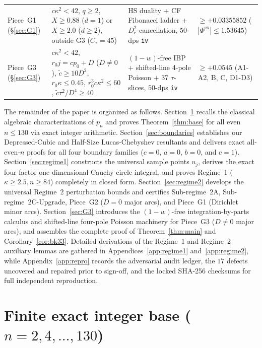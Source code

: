 \documentclass[10pt]{article}
\numberwithin{equation}{section}
\theoremstyle{plain}
\theoremstyle{definition}
\newcommand{\1}{\mathbf{1}}
\newcommand{\code}[1]{\texttt{#1}}
\begin{document}
\begin{table}[htbp]
\begin{tabularx}{\textwidth}{@{} >{\raggedright\arraybackslash}p{2.35cm} >{\raggedright\arraybackslash}X >{\raggedright\arraybackslash}p{3.45cm} >{\raggedright\arraybackslash}p{2.65cm} @{}}
\addlinespace[2pt]
Piece~G1 (\S\ref{sec:G1}) & $c\kappa^2 < 42$, $q \ge 2$, $X \ge 0.88$ ($d=1$) or $X \ge 2.0$ ($d \ge 2$), outside G3 ($C_\tau = 45$) & HS duality + CF Fibonacci ladder + $D_r^2$-cancellation, $50$-dps \code{iv} & $\ge +0.03355852$ ($|\Phi^{\mathrm{ex}}| \le 1.53645$) \\
\addlinespace[2pt]
Piece~G3 (\S\ref{sec:G3}) & $c\kappa^2 < 42$, $r_0 j = c p_0 + D$ ($D \ne 0$), $\tilde{c} \ge 10 D^2$, $r_0\kappa \le 0.45$, $r_0^3 c\kappa^2 \le 60$, $\tilde{c}\tau^2/D^4 \ge 40$ & $(1-w)$-free IBP + shifted-line 4-pole Poisson + 37 $\tau$-slices, $50$-dps \code{iv} & $\ge +0.0545$ (A1-A2, B, C, D1-D3) \\
\bottomrule
\end{tabularx}
\end{table}

The remainder of the paper is organized as follows. Section~\ref{sec:base} recalls the classical algebraic characterizations of $p_n$ and proves Theorem~\ref{thm:base} for all even $n \le 130$ via exact integer arithmetic. Section~\ref{sec:boundaries} establishes our Depressed-Cubic and Half-Size Lucas-Chebyshev resultants and delivers exact all-even-$n$ proofs for all four boundary families ($c = 0$, $a = 0$, $b = 0$, and $c = 1$). Section~\ref{sec:regime1} constructs the universal sample points $u_j$, derives the exact four-factor one-dimensional Cauchy circle integral, and proves Regime~1 ($\kappa \ge 2.5, n \ge 84$) completely in closed form. Section~\ref{sec:regime2} develops the universal Regime~2 perturbation bounds and certifies Sub-regime~2A, Sub-regime~2C-Upgrade, Piece~G2 ($D = 0$ major arcs), and Piece~G1 (Dirichlet minor arcs). Section~\ref{sec:G3} introduces the $(1-w)$-free integration-by-parts calculus and shifted-line four-pole Poisson machinery for Piece~G3 ($D \ne 0$ major arcs), and assembles the complete proof of Theorem~\ref{thm:main} and Corollary~\ref{cor:bk33}. Detailed derivations of the Regime~1 and Regime~2 auxiliary lemmas are gathered in Appendices~\ref{app:regime1} and~\ref{app:regime2}, while Appendix~\ref{app:repro} records the adversarial audit ledger, the $17$ defects uncovered and repaired prior to sign-off, and the locked SHA-256 checksums for full independent reproduction.

\section{Finite exact integer base (\texorpdfstring{$n = 2, 4, \dots, 130$}{n = 2, 4, ..., 130})}
\label{sec:base}
\end{document}

